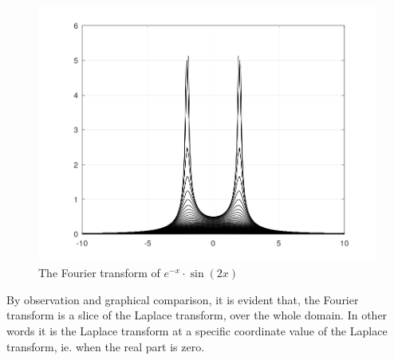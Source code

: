
			\begin{figure}[H]
			\centering
			\includegraphics[width=15cm]{FouPictures/bk.png}
    		\caption{{The Fourier transform of $e^{-x}\cdot\sin\left(2x\right)$}}
			\end{figure}

		{By observation and graphical comparison, it is evident that, the Fourier transform is a slice of the Laplace transform, over the whole domain. In other words it is the Laplace transform at a specific coordinate value of the Laplace transform, ie. when the real part is zero.}






